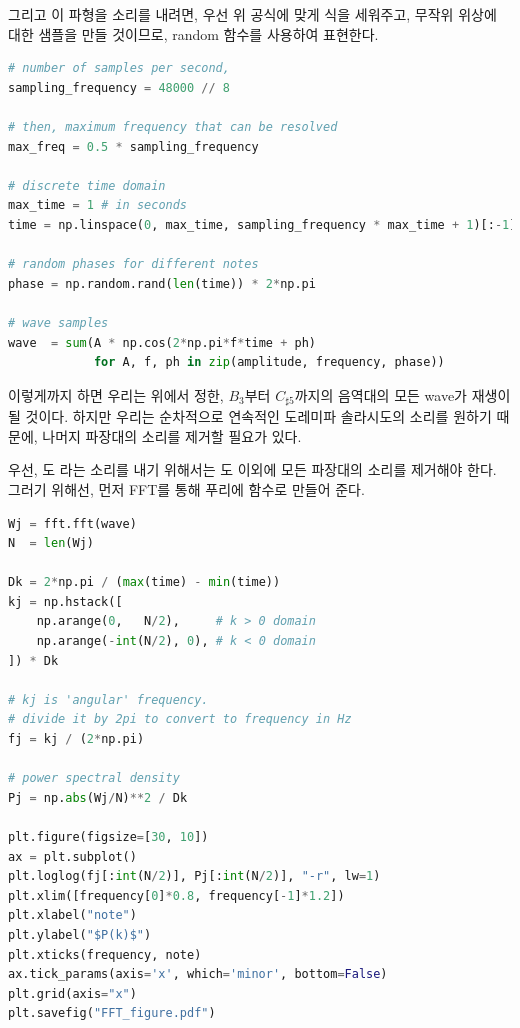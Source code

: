 \documentclass[11pt]{article}
\begin{document}
그리고 이 파형을 소리를 내려면, 우선 위 공식에 맞게 식을 세워주고, 무작위 위상에 대한 샘플을 만들 것이므로, random 함수를 사용하여 표현한다.

\begin{lstlisting}[language=Python]
# number of samples per second,
sampling_frequency = 48000 // 8

# then, maximum frequency that can be resolved
max_freq = 0.5 * sampling_frequency

# discrete time domain
max_time = 1 # in seconds
time = np.linspace(0, max_time, sampling_frequency * max_time + 1)[:-1]

# random phases for different notes
phase = np.random.rand(len(time)) * 2*np.pi

# wave samples
wave  = sum(A * np.cos(2*np.pi*f*time + ph) 
            for A, f, ph in zip(amplitude, frequency, phase))
\end{lstlisting}
이렇게까지 하면 우리는 위에서 정한,  $B_3$부터 $C_{\sharp5}$까지의 음역대의 모든 wave가 재생이 될 것이다. 하지만 우리는 순차적으로 연속적인 도레미파 솔라시도의 소리를 원하기 때문에, 나머지 파장대의 소리를 제거할 필요가 있다.

우선, 도 라는 소리를 내기 위해서는 도 이외에 모든 파장대의 소리를 제거해야 한다. 그러기 위해선, 먼저 FFT를 통해 푸리에 함수로 만들어 준다.

\begin{lstlisting}[language=Python]
Wj = fft.fft(wave)
N  = len(Wj)

Dk = 2*np.pi / (max(time) - min(time))
kj = np.hstack([
    np.arange(0,   N/2),     # k > 0 domain
    np.arange(-int(N/2), 0), # k < 0 domain
]) * Dk

# kj is 'angular' frequency.
# divide it by 2pi to convert to frequency in Hz
fj = kj / (2*np.pi)

# power spectral density
Pj = np.abs(Wj/N)**2 / Dk

plt.figure(figsize=[30, 10])
ax = plt.subplot()
plt.loglog(fj[:int(N/2)], Pj[:int(N/2)], "-r", lw=1)
plt.xlim([frequency[0]*0.8, frequency[-1]*1.2])
plt.xlabel("note")
plt.ylabel("$P(k)$")
plt.xticks(frequency, note)
ax.tick_params(axis='x', which='minor', bottom=False)
plt.grid(axis="x")
plt.savefig("FFT_figure.pdf")
\end{lstlisting}
\end{document}
